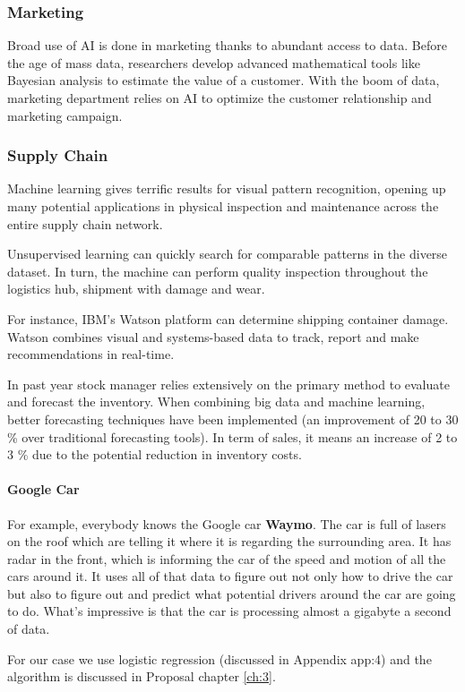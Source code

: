\subsubsection{Marketing}
Broad use of AI is done in marketing thanks to abundant access to data. Before the age of mass data, researchers develop advanced mathematical tools like Bayesian analysis to estimate the value of a customer. With the boom of data, marketing department relies on AI to optimize the customer relationship and marketing campaign.
\subsubsection{Supply Chain}
Machine learning gives terrific results for visual pattern recognition, opening up many potential applications in physical inspection and maintenance across the entire supply chain network.

Unsupervised learning can quickly search for comparable patterns in the diverse dataset. In turn, the machine can perform quality inspection throughout the logistics hub, shipment with damage and wear.

For instance, IBM's Watson platform can determine shipping container damage. Watson combines visual and systems-based data to track, report and make recommendations in real-time.

In past year stock manager relies extensively on the primary method to evaluate and forecast the inventory. When combining big data and machine learning, better forecasting techniques have been implemented (an improvement of 20 to 30 \% over traditional forecasting tools). In term of sales, it means an increase of 2 to 3 \% due to the potential reduction in inventory costs.

\paragraph{Google Car}
For example, everybody knows the Google car \textbf{Waymo}. The car is full of lasers on the roof which are telling it where it is regarding the surrounding area. It has radar in the front, which is informing the car of the speed and motion of all the cars around it. It uses all of that data to figure out not only how to drive the car but also to figure out and predict what potential drivers around the car are going to do. What's impressive is that the car is processing almost a gigabyte a second of data.


For our case we use logistic regression (discussed in Appendix app:4) and the algorithm is discussed in Proposal chapter \ref{ch:3}.
